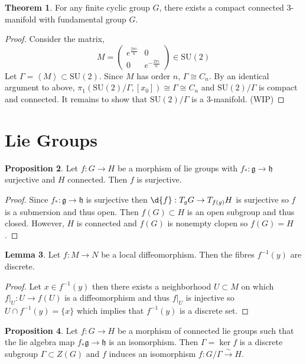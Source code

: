 \documentclass[12pt]{article}
\newcommand{\SU}[1]{\mathrm{SU}(#1)}
\theoremstyle{remark}
\theoremstyle{definition}
\newtheorem{theorem}{Theorem}[section]
\newtheorem{lemma}[theorem]{Lemma}
\newtheorem{proposition}[theorem]{Proposition}
\begin{document}
\begin{theorem}
For any finite cyclic group $G$, there exists a compact connected 3-manifold with fundamental group $G$.  
\end{theorem}

\begin{proof}
Consider the matrix,
\[
M = \begin{pmatrix}
e^{\frac{2 \pi i}{n}} & 0 \\
0 & e^{-\frac{2 \pi i}{n}}
\end{pmatrix} \in \SU{2}\]
Let $\Gamma = \left< M \right> \subset \SU{2}$. Since $M$ has order $n$, $\Gamma \cong C_n$. By an identical argument to above, $\pi_1(\SU{2}/\Gamma, [x_0]) \cong \Gamma \cong C_n$ and $\SU{2}/\Gamma$ is compact and connected. It remains to show that $\SU{2}/\Gamma$ is a 3-manifold. (WIP)
\end{proof}

\section{Lie Groups}

\newcommand{\g}{\mathfrak{g}}
\newcommand{\h}{\mathfrak{h}}

\begin{proposition}
Let $f : G \to H$ be a morphism of lie groups with $f_* : \g \to \h$ surjective and $H$ connected. Then $f$ is surjective.
\end{proposition}

\begin{proof}
Since $f_* : \g \to \h$ is surjective then $\d{f} : T_g G \to T_{f(g)} H$ is surjective so $f$ is a submersion and thus open. Then $f(G) \subset H$ is an open subgroup and thus closed. However, $H$ is connected and $f(G)$ is nonempty clopen so $f(G) = H$. 
\end{proof}

\begin{lemma}
Let $f : M \to N$ be a local diffeomorphism. Then the fibres $f^{-1}(y)$ are discrete.
\end{lemma}

\begin{proof}
Let $x \in f^{-1}(y)$ then there exists a neighborhood $U \subset M$ on which $f|_U : U \to f(U)$ is a diffeomorphism and thus $f|_U$ is injective so $U \cap f^{-1}(y) = \{ x \}$ which implies that $f^{-1}(y)$ is a discrete set.
\end{proof}

\begin{proposition}
Let $f : G \to H$ be a morphism of connected lie groups such that the lie algebra map $f_* \g \to \h$ is an isomorphism. Then $\Gamma = \ker{f}$ is a discrete subgroup $\Gamma \subset Z(G)$ and $f$ induces an isomorphism $f : G / \Gamma \xrightarrow{\sim} H$. 
\end{proposition}
\end{document}

